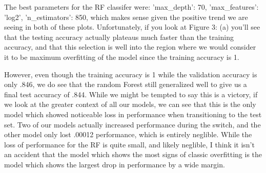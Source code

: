 \documentclass[12pt]{article}
\begin{document}
The best parameters for the RF classifer were: {'max\_depth': 70, 'max\_features': 'log2', 'n\_estimators': 850}, 
which makes sense given the positive trend we are seeing in both of these plots. Unfortunately, if you look at Figure 3: (a)
you'll see that the testing accuracy actually plateaus much faster than the training accuracy, and that this selection
is well into the region where we would consider it to be maximum overfitting of the model since the training accuracy is 1.

However, even though the training accuracy is 1 while the validation accuracy is only .846, we do see that the random Forest
still generalized well to give us a final test accuracy of .844. While we might be tempted to say this is a victory, if we 
look at the greater context of all our models, we can see that this is the only model which showed noticeable loss in 
performance when transitioning to the test set. Two of our models actually increased performance during the switch, and 
the other model only lost .00012 performance, which is entirely neglible. While the loss of performance for the RF 
is quite small, and likely neglible, I think it isn't an accident that the model which shows the most signs of classic 
overfitting is the model which shows the largest drop in performance by a wide margin.
\end{document}
